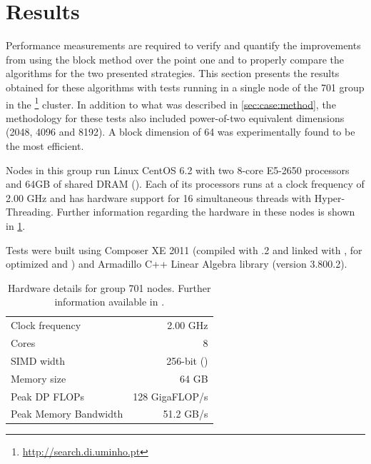 \documentclass[../thesis]{subfiles}
\begin{document}
	\section{Results}
	\label{sec:multicore:results}

	Performance measurements are required to verify and quantify the improvements from using the block method over the point one and to properly compare the algorithms for the two presented strategies. This section presents the results obtained for these algorithms with tests running in a single node of the 701 group in the \search\footnote{\url{http://search.di.uminho.pt}} cluster. In addition to what was described in \cref{sec:case:method}, the methodology for these tests also included power-of-two equivalent dimensions (2048, 4096 and 8192). A block dimension of 64 was experimentally found to be the most efficient.

	Nodes in this group run Linux CentOS 6.2 with two 8-core \intel\xeon E5-2650 processors and 64GB of shared DRAM (\numa). Each of its processors runs at a clock frequency of 2.00 GHz and has hardware support for 16 simultaneous threads with \intel Hyper-Threading. Further information regarding the hardware in these nodes is shown in \cref{tab:search:701}.

	Tests were built using \intel Composer XE 2011 (compiled with .2 and linked with \intel\mkl, for optimized \blas and \lapack) and Armadillo C++ Linear Algebra library (version 3.800.2).

	\begin{table}[p]
		\begin{center}
			\begin{tabular}{lr}
				\hline
				Clock frequency & 2.00 GHz \\
				Cores & 8 \\
				SIMD width & 256-bit (\avx) \\
				Memory size & 64 GB \\
				\hline
				Peak DP FLOPs & 128 GigaFLOP/s \\
				Peak Memory Bandwidth & 51.2 GB/s \\ 
				\hline
			\end{tabular}
		\end{center}
		\caption{Hardware details for \search group 701 nodes. Further information available in \cite{Intel:Xeon:e5_2650,Intel:Xeon:e5_2600}.}
		\label{tab:search:701}
	\end{table}
\end{document}
